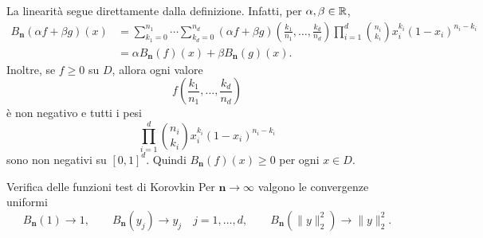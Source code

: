 \documentclass[a4paper]{article}
\begin{document}
\begin{snippetproof}{}
    La linearità segue direttamente dalla definizione. Infatti, per \(\alpha,\beta\in\mathbb{R}\),
    \begin{align*}
        B_{\mathbf n}(\alpha f+\beta g)(x)
        &=
        \sum_{k_1=0}^{n_1}\cdots\sum_{k_d=0}^{n_d}
        (\alpha f+\beta g)\left(\frac{k_1}{n_1},\ldots,\frac{k_d}{n_d}\right)
        \prod_{i=1}^d \binom{n_i}{k_i}x_i^{k_i}(1-x_i)^{n_i-k_i}\\
        &=
        \alpha B_{\mathbf n}(f)(x)+\beta B_{\mathbf n}(g)(x).
    \end{align*}
    Inoltre, se \(f\geq 0\) su \(D\), allora ogni valore
    \[
        f\left(\frac{k_1}{n_1},\ldots,\frac{k_d}{n_d}\right)
    \]
    è non negativo e tutti i pesi
    \[
        \prod_{i=1}^d \binom{n_i}{k_i}x_i^{k_i}(1-x_i)^{n_i-k_i}
    \]
    sono non negativi su \([0,1]^d\). Quindi \(B_{\mathbf n}(f)(x)\geq 0\) per ogni \(x\in D\).
\end{snippetproof}

\begin{snippetproposition}{Verifica delle funzioni test di Korovkin}
    Per \(\mathbf n\to\infty\) valgono le convergenze uniformi
    \[
        B_{\mathbf n}(1)\to 1,
        \qquad
        B_{\mathbf n}(y_j)\to y_j \quad j=1,
        \ldots,d,
        \qquad
        B_{\mathbf n}(\|y\|_2^2)\to \|y\|_2^2.
    \]
\end{snippetproposition}
\end{document}
